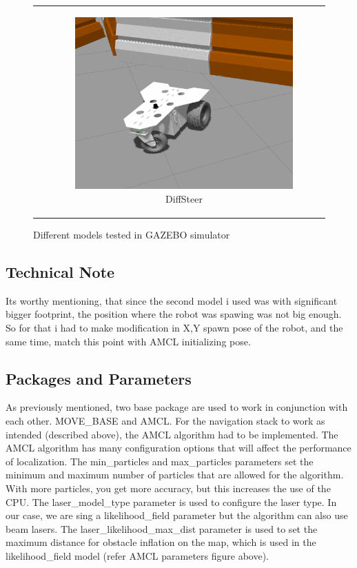\documentclass[10pt,journal,compsoc]{IEEEtran}
\begin{document}
\begin{figure}[!t]
\begin{tabular}[b]{cc}
        & \begin{subfigure}[b]{0.4\columnwidth}
            \includegraphics[width=\textwidth]{diss.png} \caption{DiffSteer}
            \label{fig:C} \end{subfigure} \end{tabular} \label{fig:ABC}
            \caption{Different models tested in GAZEBO simulator} \end{figure}

    \subsection{Technical Note} %
    Its worthy mentioning, that since the second model i used was with significant bigger footprint, the position where the robot was spawing was not big enough. So for that i had to make modification in X,Y spawn pose of the robot, and the same time, match this point with AMCL initializing pose.
    
    \subsection{Packages and Parameters}
    As previously mentioned, two base package are used to work in conjunction with each other. MOVE\_BASE and AMCL. For the navigation stack to work as intended (described above), the AMCL algorithm had to be implemented. The AMCL algorithm has many configuration options that will affect the performance of localization. The min\_particles and max\_particles parameters set the minimum and maximum number of particles that are	allowed	for	the	algorithm. With	more particles, you get more accuracy, but this	increases the use of the CPU. The laser\_model\_type parameter is used to configure the laser type. In our	case, we are sing a	 likelihood\_field parameter but the algorithm can also use beam lasers. The laser\_likelihood\_max\_dist parameter is used to set the maximum distance for obstacle inflation on the	map, which is used	in	the	 likelihood\_field model (refer AMCL parameters figure above). 
\end{document}

